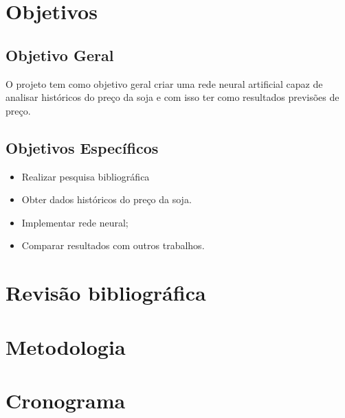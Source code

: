 \documentclass[a4paper,12pt]{article}
\begin{document}

\section{Objetivos}

\subsection{Objetivo Geral}

O projeto tem como objetivo geral criar uma rede neural artificial capaz de analisar históricos do preço da soja e com isso ter como resultados previsões de preço.

\subsection{Objetivos Específicos}
\begin{itemize}
 \item Realizar pesquisa bibliográfica
 \item Obter dados históricos do preço da soja.
 \item Implementar rede neural;
 \item Comparar resultados com outros trabalhos.
\end{itemize}


\newpage


\section{Revisão bibliográfica}


\newpage




\section{Metodologia}



\newpage



\section{Cronograma}
\end{document}
